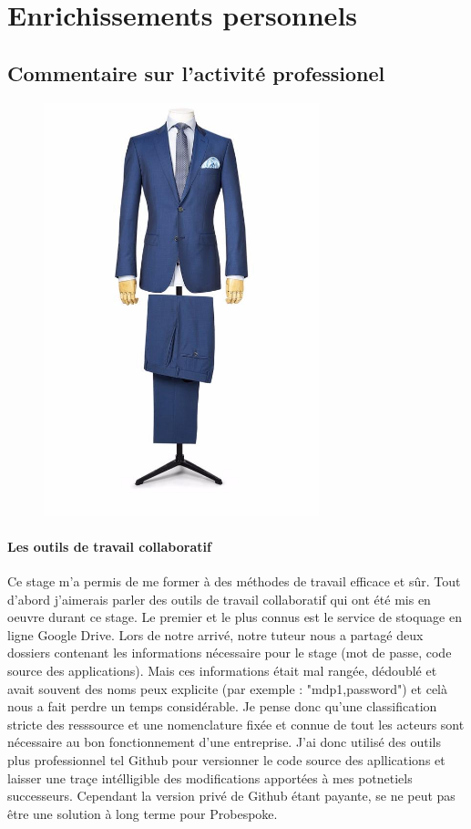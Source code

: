 \section{Enrichissements personnels}
\subsection{Commentaire sur l'activité professionel}

\begin{figure}
\includegraphics[width=8cm]{image/bleuciel.jpg}
\end{figure}
\paragraph{Les outils de travail collaboratif}
Ce stage m'a permis de me former à des méthodes de travail efficace et sûr. Tout d'abord j'aimerais parler des outils de travail collaboratif qui ont été mis en oeuvre durant ce stage. Le premier et le plus connus est le service de stoquage en ligne Google Drive. Lors de notre arrivé, notre tuteur nous a partagé deux dossiers contenant les informations nécessaire pour le stage (mot de passe, code source des applications). Mais ces informations était mal rangée, dédoublé et avait souvent des noms peux explicite (par exemple : "mdp1,password") et celà nous a fait perdre un temps considérable. Je pense donc qu'une classification stricte des resssource et une nomenclature fixée et connue de tout les acteurs sont nécessaire au bon fonctionnement d'une entreprise. J'ai donc utilisé des outils plus professionnel tel Github pour versionner le code source des apllications et laisser une traçe intélligible des modifications apportées à mes potnetiels successeurs. Cependant la version privé de Github étant payante, se ne peut pas être une solution à long terme pour Probespoke.

